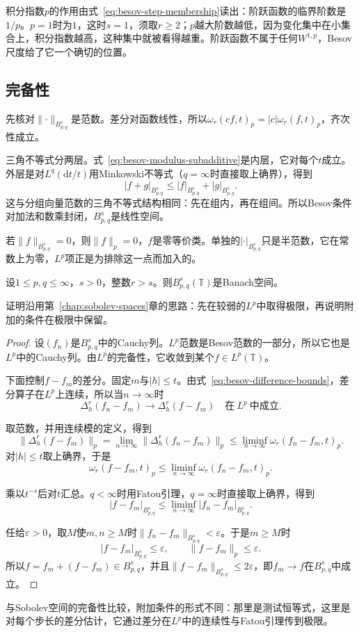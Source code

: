 积分指数$p$的作用由式~\eqref{eq:besov-step-membership}读出：阶跃函数的临界阶数是$1/p$。$p=1$时为$1$，这时$s=1$，须取$r\geq2$；$p$越大阶数越低，因为变化集中在小集合上，积分指数越高，这种集中就被看得越重。阶跃函数不属于任何$W^{1,p}$，Besov尺度给了它一个确切的位置。

\subsection{完备性}
\label{sec:besov-completeness}

先核对$\lVert\cdot\rVert_{B^s_{p,q}}$是范数。差分对函数线性，所以$\omega_r(cf,t)_p=\lvert c\rvert\omega_r(f,t)_p$，齐次性成立。

三角不等式分两层。式~\eqref{eq:besov-modulus-subadditive}是内层，它对每个$t$成立。外层是对$L^q(\mathrm dt/t)$用Minkowski不等式（$q=\infty$时直接取上确界），得到
\[
 \lvert f+g\rvert_{B^s_{p,q}}\leq\lvert f\rvert_{B^s_{p,q}}+\lvert g\rvert_{B^s_{p,q}} .
\]
这与分组向量范数的三角不等式结构相同：先在组内，再在组间。所以Besov条件对加法和数乘封闭，$B^s_{p,q}$是线性空间。

若$\lVert f\rVert_{B^s_{p,q}}=0$，则$\lVert f\rVert_p=0$，$f$是零等价类。单独的$\lvert\cdot\rvert_{B^s_{p,q}}$只是半范数，它在常数上为零，$L^p$项正是为排除这一点而加入的。

\begin{theorem}[Besov空间的完备性]
\label{thm:besov-complete}
设$1\leq p,q\leq\infty$，$s>0$，整数$r>s$。则$B^s_{p,q}(\mathbb T)$是Banach空间。
\end{theorem}

证明沿用第~\ref{chap:sobolev-spaces}章的思路：先在较弱的$L^p$中取得极限，再说明附加的条件在极限中保留。

\begin{proof}
设$(f_n)$是$B^s_{p,q}$中的Cauchy列。$L^p$范数是Besov范数的一部分，所以它也是$L^p$中的Cauchy列。由$L^p$的完备性，它收敛到某个$f\in L^p(\mathbb T)$。

下面控制$f-f_m$的差分。固定$m$与$\lvert h\rvert\leq t$。由式~\eqref{eq:besov-difference-bounds}，差分算子在$L^p$上连续，所以当$n\to\infty$时
\[
 \Delta_h^r(f_n-f_m)\to\Delta_h^r(f-f_m)\quad\text{在}\ L^p\ \text{中成立}.
\]

取范数，并用连续模的定义，得到
\[
 \lVert\Delta_h^r(f-f_m)\rVert_p=\lim_{n\to\infty}\lVert\Delta_h^r(f_n-f_m)\rVert_p\leq\liminf_{n\to\infty}\omega_r(f_n-f_m,t)_p .
\]
对$\lvert h\rvert\leq t$取上确界，于是
\[
 \omega_r(f-f_m,t)_p\leq\liminf_{n\to\infty}\omega_r(f_n-f_m,t)_p .
\]

乘以$t^{-s}$后对$t$汇总。$q<\infty$时用Fatou引理，$q=\infty$时直接取上确界，得到
\[
 \lvert f-f_m\rvert_{B^s_{p,q}}\leq\liminf_{n\to\infty}\lvert f_n-f_m\rvert_{B^s_{p,q}} .
\]

任给$\varepsilon>0$，取$M$使$m,n\geq M$时$\lVert f_n-f_m\rVert_{B^s_{p,q}}<\varepsilon$。于是$m\geq M$时
\[
 \lvert f-f_m\rvert_{B^s_{p,q}}\leq\varepsilon,\qquad\lVert f-f_m\rVert_p\leq\varepsilon .
\]
所以$f=f_m+(f-f_m)\in B^s_{p,q}$，并且$\lVert f-f_m\rVert_{B^s_{p,q}}\leq2\varepsilon$，即$f_m\to f$在$B^s_{p,q}$中成立。
\end{proof}

与Sobolev空间的完备性比较，附加条件的形式不同：那里是测试恒等式，这里是对每个步长的差分估计，它通过差分在$L^p$中的连续性与Fatou引理传到极限。
